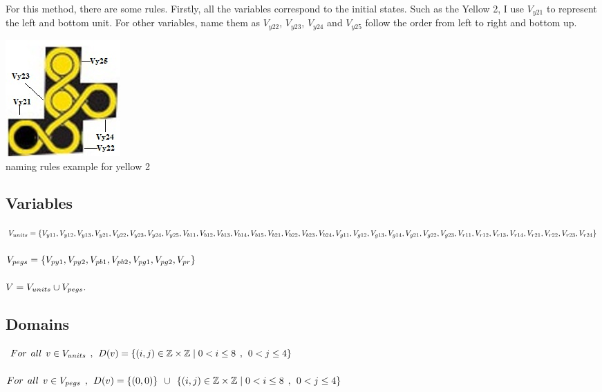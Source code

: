 For this method, there are some rules. Firstly, all the variables correspond to the initial states. Such as the Yellow 2, I use $V_{y21}$ to represent the left and bottom unit. For other variables, name them as $V_{y22}$, $V_{y23}$, $V_{y24}$ and $V_{y25}$ follow the order from left to right and bottom up.
\begin{center}
\includegraphics{example.jpg}
\\naming rules example for yellow 2
\end{center}
\subsection{Variables}

$V_{units}=\{ V_{y11},V_{y12},
V_{y13},V_{y21},V_{y22},V_{y23},V_{y24},V_{y25},\\V_{b11},V_{b12},V_{b13},V_{b14},
V_{b15},V_{b21},V_{b22},V_{b23},\\V_{b24},V_{g11},V_{g12},V_{g13},V_{g14},V_{g21},V_{g22},V_{g23},\\V_{r11},
V_{r12},V_{r13},V_{r14},V_{r21},V_{r22},V_{r23},V_{r24}\}$\\
\\$V_{pegs} = \{V_{py1}, V_{py2}, V_{pb1}, V_{pb2}, V_{pg1}, V_{pg2}, V_{pr}\}$\\
\\$V = V_{units} \cup V_{pegs}.$
\subsection{Domains}
$For \hspace{1ex} all \hspace{1ex} v \in V_{units} \hspace{1ex},\hspace{1ex} D(v)=\{(i,j) \in \mathbb{Z} \times \mathbb{Z}	\mid  0<i \leq 8 \hspace{1ex} , \hspace{1ex} 0<j \leq 4\}$\\
\\
$For \hspace{1ex} all \hspace{1ex} v \in V_{pegs} \hspace{1ex},\hspace{1ex} D(v)=\{(0,0)\} \hspace{1ex} \cup \hspace{1ex}\{(i,j) \in \mathbb{Z} \times \mathbb{Z}\mid  0<i \leq 8 \hspace{1ex} , \hspace{1ex} 0<j \leq 4\}$
